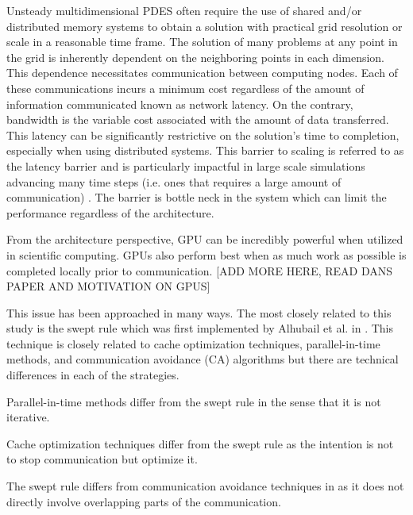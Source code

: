 \documentclass[review]{elsarticle}
\begin{document}
Unsteady multidimensional PDES often require the use of shared and/or distributed memory systems to obtain a solution with practical grid resolution or scale in a reasonable time frame. The solution of many problems at any point in the grid is inherently dependent on the neighboring points in each dimension. This dependence necessitates communication between computing nodes. Each of these communications incurs a minimum cost regardless of the amount of information communicated known as network latency. On the contrary, bandwidth is the variable cost associated with the amount of data transferred. This latency can be significantly restrictive on the solution's time to completion, especially when using distributed systems. This barrier to scaling is referred to as the latency barrier and is particularly impactful in large scale simulations advancing many time steps (i.e. ones that requires a large amount of communication) \cite{Alhubail2016ThePDEs}. The barrier is bottle neck in the system which can limit the performance regardless of the architecture.

\par
From the architecture perspective, GPU can be incredibly powerful when utilized in scientific computing. GPUs also perform best when as much work as possible is completed locally prior to communication. [ADD MORE HERE, READ DANS PAPER AND MOTIVATION ON GPUS]

\par This issue has been approached in many ways. The most closely related to this study is the swept rule which was first implemented by Alhubail et al. in \cite{Alhubail2016ThePDEs}. This technique is closely related to cache optimization techniques, parallel-in-time methods, and communication avoidance (CA) algorithms but there are technical differences in each of the strategies.

\par
Parallel-in-time methods differ from the swept rule in the sense that it is not iterative.

\par
Cache optimization techniques differ from the swept rule as the intention is not to stop communication but optimize it.

\par
The swept rule differs from communication avoidance techniques in as it does not directly involve overlapping parts of the communication.
\end{document}
